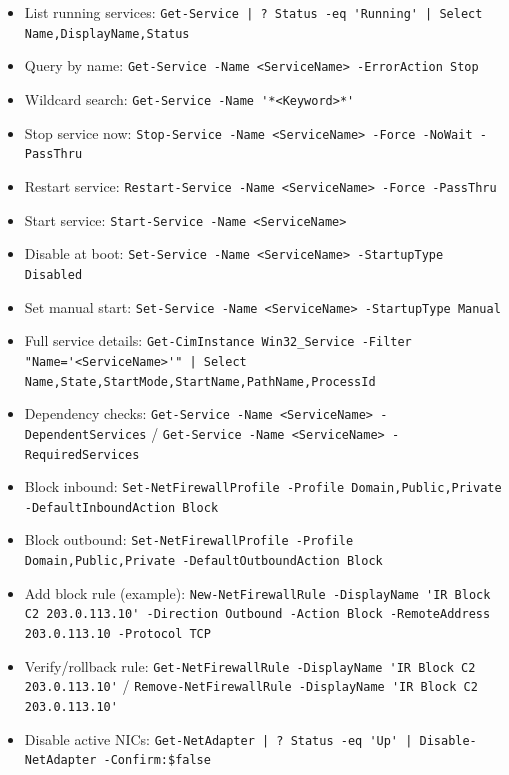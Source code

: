 \documentclass[10pt]{article}
\begin{document}
\begin{tcolorbox}[title=Service Containment + Verification]
\begin{itemize}[leftmargin=1.1em, itemsep=1pt, topsep=2pt]
  \item List running services: \verb!Get-Service | ? Status -eq 'Running' | Select Name,DisplayName,Status!
  \item Query by name: \verb!Get-Service -Name <ServiceName> -ErrorAction Stop!
  \item Wildcard search: \verb!Get-Service -Name '*<Keyword>*'!
  \item Stop service now: \verb!Stop-Service -Name <ServiceName> -Force -NoWait -PassThru!
  \item Restart service: \verb!Restart-Service -Name <ServiceName> -Force -PassThru!
  \item Start service: \verb!Start-Service -Name <ServiceName>!
  \item Disable at boot: \verb!Set-Service -Name <ServiceName> -StartupType Disabled!
  \item Set manual start: \verb!Set-Service -Name <ServiceName> -StartupType Manual!
  \item Full service details: \verb!Get-CimInstance Win32_Service -Filter "Name='<ServiceName>'" | Select Name,State,StartMode,StartName,PathName,ProcessId!
  \item Dependency checks: \verb!Get-Service -Name <ServiceName> -DependentServices! / \verb!Get-Service -Name <ServiceName> -RequiredServices!
\end{itemize}
\end{tcolorbox}

\begin{tcolorbox}[title=Fast Host Isolation]
\begin{itemize}[leftmargin=1.1em, itemsep=1pt, topsep=2pt]
  \item Block inbound: \verb!Set-NetFirewallProfile -Profile Domain,Public,Private -DefaultInboundAction Block!
  \item Block outbound: \verb!Set-NetFirewallProfile -Profile Domain,Public,Private -DefaultOutboundAction Block!
  \item Add block rule (example): \verb!New-NetFirewallRule -DisplayName 'IR Block C2 203.0.113.10' -Direction Outbound -Action Block -RemoteAddress 203.0.113.10 -Protocol TCP!
  \item Verify/rollback rule: \verb!Get-NetFirewallRule -DisplayName 'IR Block C2 203.0.113.10'! / \verb!Remove-NetFirewallRule -DisplayName 'IR Block C2 203.0.113.10'!
  \item Disable active NICs: \verb!Get-NetAdapter | ? Status -eq 'Up' | Disable-NetAdapter -Confirm:$false!
\end{itemize}
\end{tcolorbox}
\end{document}
